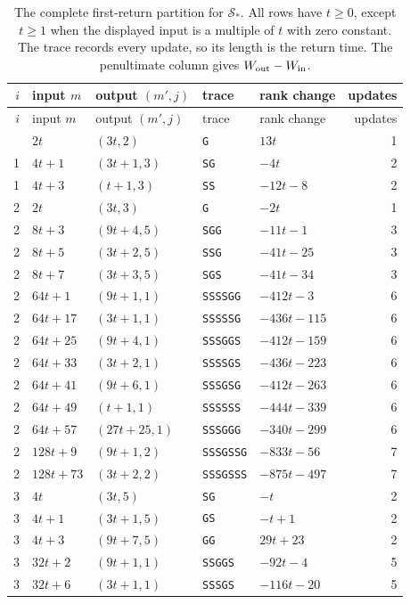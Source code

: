 \begingroup
\small
\setlength{\tabcolsep}{7pt}
\begin{longtable}{rllllr}
\caption{The complete first-return partition for $\mathcal S_*$. All rows have
$t\ge0$, except $t\ge1$ when the displayed input is a multiple of $t$
with zero constant. The trace records every update, so its length is the
return time. The penultimate column gives $W_{\rm out}-W_{\rm in}$.}
\label{tab:seven-three-cylinders}\\
\toprule
$i$&input $m$&output $(m',j)$&trace&rank change&updates\\\midrule
\endfirsthead
\toprule
$i$&input $m$&output $(m',j)$&trace&rank change&updates\\\midrule
\endhead
\bottomrule
\endfoot
1&$2t$&$(3t,2)$&\texttt{G}&$13t$&1\\
1&$4t+1$&$(3t+1,3)$&\texttt{SG}&$-4t$&2\\
1&$4t+3$&$(t+1,3)$&\texttt{SS}&$-12t-8$&2\\
2&$2t$&$(3t,3)$&\texttt{G}&$-2t$&1\\
2&$8t+3$&$(9t+4,5)$&\texttt{SGG}&$-11t-1$&3\\
2&$8t+5$&$(3t+2,5)$&\texttt{SSG}&$-41t-25$&3\\
2&$8t+7$&$(3t+3,5)$&\texttt{SGS}&$-41t-34$&3\\
2&$64t+1$&$(9t+1,1)$&\texttt{SSSSGG}&$-412t-3$&6\\
2&$64t+17$&$(3t+1,1)$&\texttt{SSSSSG}&$-436t-115$&6\\
2&$64t+25$&$(9t+4,1)$&\texttt{SSSGGS}&$-412t-159$&6\\
2&$64t+33$&$(3t+2,1)$&\texttt{SSSSGS}&$-436t-223$&6\\
2&$64t+41$&$(9t+6,1)$&\texttt{SSSGSG}&$-412t-263$&6\\
2&$64t+49$&$(t+1,1)$&\texttt{SSSSSS}&$-444t-339$&6\\
2&$64t+57$&$(27t+25,1)$&\texttt{SSSGGG}&$-340t-299$&6\\
2&$128t+9$&$(9t+1,2)$&\texttt{SSSGSSG}&$-833t-56$&7\\
2&$128t+73$&$(3t+2,2)$&\texttt{SSSGSSS}&$-875t-497$&7\\
3&$4t$&$(3t,5)$&\texttt{SG}&$-t$&2\\
3&$4t+1$&$(3t+1,5)$&\texttt{GS}&$-t+1$&2\\
3&$4t+3$&$(9t+7,5)$&\texttt{GG}&$29t+23$&2\\
3&$32t+2$&$(9t+1,1)$&\texttt{SSGGS}&$-92t-4$&5\\
3&$32t+6$&$(3t+1,1)$&\texttt{SSSGS}&$-116t-20$&5\\

\end{longtable}

